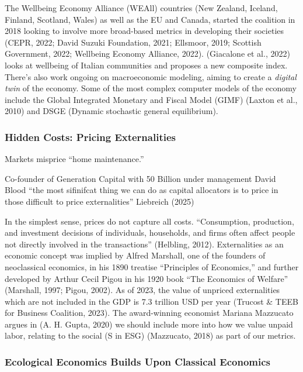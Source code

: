 \documentclass[
  12pt,
  letterpaper,
  DIV=11,
  numbers=noendperiod]{scrartcl}
\begin{document}
The Wellbeing Economy Alliance (WEAll) countries (New Zealand, Iceland,
Finland, Scotland, Wales) as well as the EU and Canada, started the
coalition in 2018 looking to involve more broad-based metrics in
developing their societies (CEPR, 2022; David Suzuki Foundation, 2021;
Ellsmoor, 2019; Scottish Government, 2022; Wellbeing Economy Alliance,
2022). (Giacalone et al., 2022) looks at wellbeing of Italian
communities and proposes a new composite index. There's also work
ongoing on macroeconomic modeling, aiming to create a \emph{digital
twin} of the economy. Some of the most complex computer models of the
economy include the Global Integrated Monetary and Fiscal Model (GIMF)
(Laxton et al., 2010) and DSGE (Dynamic stochastic general equilibrium).

\subsubsection{Hidden Costs: Pricing
Externalities}\label{hidden-costs-pricing-externalities}

Markets misprice ``home maintenance.''

Co-founder of Generation Capital with 50 Billion under management David
Blood ``the most sifinifcat thing we can do as capital allocators is to
price in those difficult to price externalities'' Liebreich (2025)

In the simplest sense, prices do not capture all costs. ``Consumption,
production, and investment decisions of individuals, households, and
firms often affect people not directly involved in the transactions''
(Helbling, 2012). Externalities as an economic concept was implied by
Alfred Marshall, one of the founders of neoclassical economics, in his
1890 treatise ``Principles of Economics,'' and further developed by
Arthur Cecil Pigou in his 1920 book ``The Economics of Welfare''
(Marshall, 1997; Pigou, 2002). As of 2023, the value of unpriced
externalities which are not included in the GDP is 7.3 trillion USD per
year (Trucost \& TEEB for Business Coalition, 2023). The award-winning
economist Mariana Mazzucato argues in (A. H. Gupta, 2020) we should
include more into how we value unpaid labor, relating to the social (S
in ESG) (Mazzucato, 2018) as part of our metrics.

\subsubsection{Ecological Economics Builds Upon Classical
Economics}\label{ecological-economics-builds-upon-classical-economics}
\end{document}
